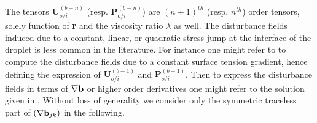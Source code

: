 The tensors $\textbf{U}^{(b-n)}_{o/i}$ (resp. $\textbf{P}^{(b-n)}_{o/i}$) are $(n+1)^{th}$ (resp. $n^{th}$) order tensors, solely function of \textbf{r} and the viscosity ratio $\lambda$ as well. 
The disturbance fields induced due to a constant, linear, or quadratic stress jump at the interface of the droplet is less common in the literature. 
For instance one might refer to \citet{Subramanian_1985,leal2007advanced} to compute the disturbance fields due to a constant surface tension gradient, hence defining the expression of  $\textbf{U}_{o/i}^{(b-1)}$ and $\textbf{P}_{o/i}^{(b-1)}$. 
Then to express the disturbance fields in terms of $\mathbf{\nabla} \textbf{b}$ or higher order derivatives one might refer to the solution given in \citet[Appendix C]{raja2010inertial}.
Without loss of generality we consider only the symmetric traceless part of $(\mathbf{\nabla} \textbf{b}_{jk})$ in the following. 


